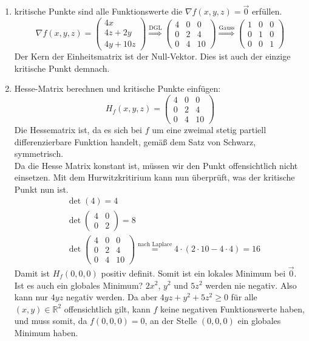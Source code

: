 \documentclass[10pt,a4paper,parskip=half]{scrartcl}
\begin{document}
\begin{enumerate}
	\item kritische Punkte sind alle Funktionswerte die $\nabla f(x,y,z) = \vec0$ erfüllen.
	\[\nabla f(x,y,z) = 
	\begin{pmatrix}
		4x \\ 
		4z + 2y \\
		4y + 10z	
	\end{pmatrix} \overset{\text{DGL}}{\Rightarrow}
	\begin{pmatrix}
		4 & 0 & 0 \\
		0 & 2 & 4 \\
		0 & 4 & 10 
	\end{pmatrix} \overset{\text{Gauss}}{\Rightarrow}
	\begin{pmatrix}
		1 & 0 & 0 \\
		0 & 1 & 0 \\
		0 & 0 & 1
	\end{pmatrix}\]
	Der Kern der Einheitsmatrix ist der Null-Vektor. Dies ist auch der einzige kritische Punkt demnach.
	\item Hesse-Matrix berechnen und kritische Punkte einfügen:
	\[H_f(x,y,z) =
	\begin{pmatrix}
		4 & 0 & 0 \\
		0 & 2 & 4 \\
		0 & 4 & 10
	\end{pmatrix}
	\] 
	Die Hessematrix ist, da es sich bei $f$ um eine zweimal stetig partiell differenzierbare Funktion handelt, gemäß dem Satz von Schwarz, symmetrisch.\\
	Da die Hesse Matrix konstant ist, müssen wir den Punkt offensichtlich nicht einsetzen. Mit dem Hurwitzkritirium kann nun überprüft, was der kritische Punkt nun ist. 
	\begin{align*}
	 	&\det(4) = 4 \\
	 	&\det \begin{pmatrix}
	 		4 & 0 \\
	 		0 & 2	
	 	\end{pmatrix} = 8 \\
	 	&\det \begin{pmatrix}
	 		4 & 0 & 0 \\
			0 & 2 & 4 \\
			0 & 4 & 10
	 	\end{pmatrix} \overset{\text{nach Laplace}}{=} 4\cdot (2\cdot10 - 4\cdot4) = 16
	 \end{align*} Damit ist $H_f(0,0,0)$ positiv definit. Somit ist ein lokales Minimum bei $\vec 0$. Ist es auch ein globales Minimum? 
	$2x^2$, $y^2$ und $5z^2$ werden nie negativ. Also kann nur $4yz$ negativ werden. Da aber $4yz  + y^2 + 5z^2 \ge 0$ für alle $(x,y) \in \mathbb{R}^2$ offensichtlich gilt, kann $f$ keine negativen Funktionswerte haben,  und muss somit, da $f(0,0,0) = 0$, an der Stelle $(0,0,0)$ ein globales Minimum haben.
\end{enumerate}
\end{document}
